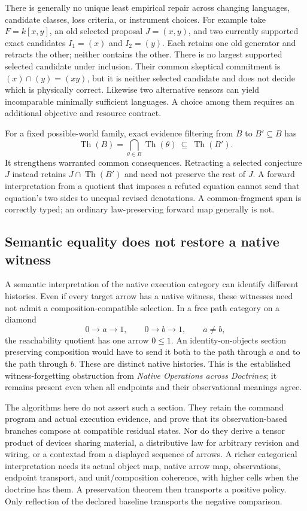 \documentclass[11pt]{article}
\theoremstyle{definition}
\theoremstyle{remark}
\begin{document}
There is generally no unique least empirical repair across changing
languages, candidate classes, loss criteria, or instrument choices. For
example take $F=k[x,y]$, an old selected proposal $J=(x,y)$, and two
currently supported exact candidates $I_1=(x)$ and $I_2=(y)$. Each retains
one old generator and retracts the other; neither contains the other.
There is no largest supported selected candidate under inclusion. Their
common skeptical commitment is $(x)\cap(y)=(xy)$, but it is neither selected
candidate and does not decide which is physically correct. Likewise two
alternative sensors can yield incomparable minimally sufficient
languages. A choice among them requires an additional objective and
resource contract.

For a fixed possible-world family, exact evidence filtering from $B$ to
$B'\subseteq B$ has
\[
 \operatorname{Th}(B)=\bigcap_{\theta\in B}\operatorname{Th}(\theta)
 \ \subseteq\
 \operatorname{Th}(B').
\]
It strengthens warranted common consequences. Retracting a selected
conjecture $J$ instead retains $J\cap\operatorname{Th}(B')$ and need not
preserve the rest of $J$. A forward interpretation from a quotient that
imposes a refuted equation cannot send that equation's two sides to
unequal revised denotations. A common-fragment span is correctly typed;
an ordinary law-preserving forward map generally is not.

\subsection{Semantic equality does not restore a native witness}
A semantic interpretation of the native execution category can identify
different histories. Even if every target arrow has a native witness,
these witnesses need not admit a composition-compatible selection. In a
free path category on a diamond
\[
 0\longrightarrow a\longrightarrow1,
 \qquad 0\longrightarrow b\longrightarrow1,
 \qquad a\ne b,
\]
the reachability quotient has one arrow $0\leq1$. An identity-on-objects
section preserving composition would have to send it both to the path
through $a$ and to the path through $b$. These are distinct native
histories. This is the established witness-forgetting obstruction from
\emph{Native Operations across Doctrines}; it remains present even when
all endpoints and their observational meanings agree.

The algorithms here do not assert such a section. They retain the
command program and actual execution evidence, and prove that its
observation-based branches compose at compatible residual states. Nor do
they derive a tensor product of devices sharing material, a distributive
law for arbitrary revision and wiring, or a contextad from a displayed
sequence of arrows. A richer categorical interpretation needs its actual
object map, native arrow map, observations, endpoint transport, and
unit/composition coherence, with higher cells when the doctrine has them.
A preservation theorem then transports a positive policy. Only reflection
of the declared baseline transports the negative comparison.
\end{document}

